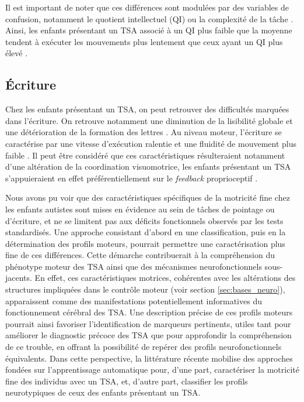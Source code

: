 Il est important de noter que ces différences sont modulées par des variables de confusion, notamment le quotient intellectuel (QI) ou la complexité de la tâche \parencite{Mari2003Feb}. Ainsi, les enfants présentant un TSA associé à un QI plus faible que la moyenne tendent à exécuter les mouvements plus lentement que ceux ayant un QI plus élevé \parencite{Mari2003Feb}.


\subsection{Écriture} \label{sec:ecriture}
Chez les enfants présentant un TSA, on peut retrouver des difficultés marquées dans l'écriture. On retrouve notamment une diminution de la lisibilité globale et une détérioration de la formation des lettres \parencite{Kushki2011Dec, Handle2022Oct}. Au niveau moteur, l'écriture se caractérise par une vitesse d'exécution ralentie et une fluidité de mouvement plus faible \parencite{benchekri_mieux_2024, kangarani-farahani_motor_2024, Handle2022Oct}.
Il peut être considéré que ces caractéristiques résulteraient notamment d'une altération de la coordination visuomotrice, les enfants présentant un TSA s'appuieraient en effet préférentiellement sur le \textit{feedback} proprioceptif \parencite{benchekri_mieux_2024, kangarani-farahani_motor_2024, shafer_visual_2021}. %
\medskip


Nous avons pu voir que des caractéristiques spécifiques de la motricité fine chez les enfants autistes sont mises en évidence au sein de tâches de pointage ou d'écriture, et ne se limitent pas aux déficits fonctionnels observés par les tests standardisés. Une approche consistant d'abord en une classification, puis en la détermination des profils moteurs, pourrait permettre une caractérisation plus fine de ces différences. Cette démarche contribuerait à la compréhension du phénotype moteur des TSA ainsi que des mécanismes neurofonctionnels sous-jacents. En effet, ces caractéristiques motrices, cohérentes avec les altérations des structures impliquées dans le contrôle moteur (voir section \ref{sec:bases_neuro}), apparaissent comme des manifestations potentiellement informatives du fonctionnement cérébral des TSA. Une description précise de ces profils moteurs pourrait ainsi favoriser l'identification de marqueurs pertinents, utiles tant pour améliorer le diagnostic précoce des TSA que pour approfondir la compréhension de ce trouble, en offrant la possibilité de repérer des profils neurofonctionnels équivalents.
Dans cette perspective, la littérature récente mobilise des approches fondées sur l'apprentissage automatique pour, d'une part, caractériser la motricité fine des individus avec un TSA, et, d'autre part, classifier les profils neurotypiques de ceux des enfants présentant un TSA.

